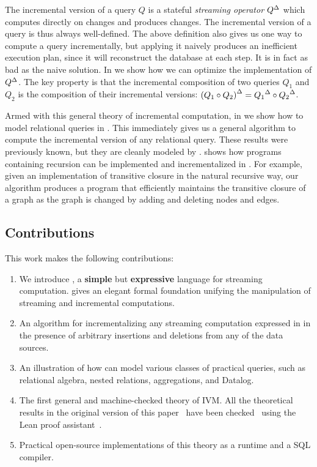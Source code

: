 The incremental version of a query $Q$ is a stateful \emph{streaming
operator} ${Q}^{\Delta}$ which computes directly on changes and produces
changes.  The incremental version of a query is thus always
well-defined.  The above definition also gives us one way to compute a
query incrementally, but applying it naively produces an inefficient
execution plan, since it will reconstruct the database at each step.
It is in fact as bad as the naive solution.  In
 we show how we can optimize the
implementation of ${Q}^{\Delta}$. The key property is that the incremental
composition of two queries $Q_1$ and $Q_2$ is the composition of their
incremental versions: ${(Q_1 \circ Q_2)}^{\Delta} = {Q_1}^{\Delta} \circ
{Q_2}^{\Delta}$.

Armed with this general theory of incremental computation, in
 we show how to model relational queries in
\dbsp.  This immediately gives us a general algorithm to compute the
incremental version of any relational query.  These results were
previously known, but they are cleanly modeled by \dbsp.
 shows how programs containing recursion can be
implemented and incrementalized in \dbsp.  For example, given an
implementation of transitive closure in the natural recursive way, our
algorithm produces a program that efficiently maintains the transitive
closure of a graph as the graph is changed by adding and deleting
nodes and edges.

\subsection{Contributions}

This work makes the following contributions:
\begin{enumerate}
  \item We introduce \dbsp, a \textbf{simple} but \textbf{expressive}
    language for streaming computation. \dbsp gives an elegant formal
    foundation unifying the manipulation of streaming and incremental
    computations.
  \item An algorithm for incrementalizing any streaming
    computation expressed in \dbsp in the presence of arbitrary
    insertions and deletions from any of the data sources.
  \item An illustration of how \dbsp can model various classes of
    practical queries, such as relational algebra, nested relations,
    aggregations, and Datalog.
  \item The first general and machine-checked theory of IVM.  All the
    theoretical results in the original version of this
    paper~\cite{budiu-vldb23} have been checked~\cite{dbsp-theory}
    using the Lean proof assistant~\cite{moura-cade15}.
  \item Practical open-source implementations of this theory as a
    runtime and a SQL compiler.
\end{enumerate}

